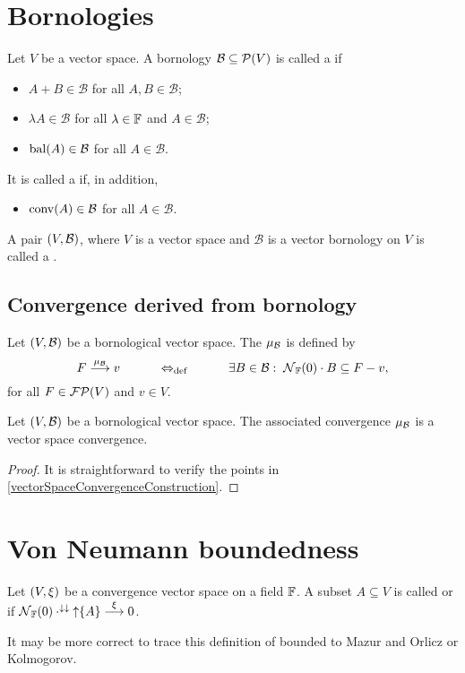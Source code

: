 \section{Bornologies}
\begin{definition}
Let $V$ be a vector space. A bornology $\mathcal{B}\subseteq \operatorname{\mathcal{P}}(V)$ is called a  if
\begin{itemize}
\item $A+B\in \mathcal{B}$ for all $A,B\in \mathcal{B}$;
\item $\lambda A \in \mathcal{B}$ for all $\lambda\in \mathbb{F}$ and $A\in \mathcal{B}$;
\item $\operatorname{bal}(A) \in \mathcal{B}$ for all $A\in \mathcal{B}$.
\end{itemize}
It is called a  if, in addition,
\begin{itemize}
\item $\operatorname{conv}(A) \in \mathcal{B}$ for all $A\in \mathcal{B}$.
\end{itemize}
A pair $\sSet{V,\mathcal{B}}$, where $V$ is a vector space and $\mathcal{B}$ is a vector bornology on $V$ is called a .
\end{definition}

\subsection{Convergence derived from bornology}
\begin{definition}
Let $\sSet{V, \mathcal{B}}$ be a bornological vector space. The  $\mu_{\mathcal{B}}$ is defined by
\[ F\overset{\mu_{\mathcal{B}}}{\longrightarrow} v \qquad\quad\Leftrightarrow_{\text{def}}\quad\qquad \exists B\in \mathcal{B}: \; \operatorname{\mathcal{N}}_{\mathbb{F}}(0)\cdot B \subseteq F-v, \]
for all $F\in \operatorname{\mathcal{FP}}(V)$ and $v\in V$.
\end{definition}

\begin{lemma}
Let $\sSet{V, \mathcal{B}}$ be a bornological vector space. The associated convergence $\mu_{\mathcal{B}}$ is a vector space convergence.
\end{lemma}
\begin{proof}
It is straightforward to verify the points in \ref{vectorSpaceConvergenceConstruction}.
\end{proof}

\section{Von Neumann boundedness}
\begin{definition}
Let $\sSet{V,\xi}$ be a convergence vector space on a field $\mathbb{F}$. A subset $A\subseteq V$ is called  or  if $\operatorname{\mathcal{N}}_{\mathbb{F}}(0) \cdot^{\downarrow\downarrow} \operatorname{\uparrow}\{A\} \overset{\xi}{\longrightarrow} 0$.
\end{definition}
It may be more correct to trace this definition of bounded to Mazur and Orlicz or Kolmogorov.

